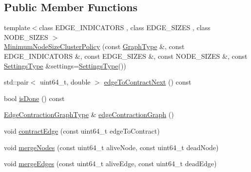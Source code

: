 \subsection*{Public Member Functions}
\begin{DoxyCompactItemize}
\item 
{\footnotesize template$<$class E\+D\+G\+E\+\_\+\+I\+N\+D\+I\+C\+A\+T\+O\+RS , class E\+D\+G\+E\+\_\+\+S\+I\+Z\+ES , class N\+O\+D\+E\+\_\+\+S\+I\+Z\+ES $>$ }\\\hyperlink{classnifty_1_1graph_1_1agglo_1_1MinimumNodeSizeClusterPolicy_a560b4f00ebeb74357401ba641fef6aea}{Minimum\+Node\+Size\+Cluster\+Policy} (const \hyperlink{classnifty_1_1graph_1_1agglo_1_1MinimumNodeSizeClusterPolicy_a6d81a64ca67c9feec052a031552282f0}{Graph\+Type} \&, const E\+D\+G\+E\+\_\+\+I\+N\+D\+I\+C\+A\+T\+O\+RS \&, const E\+D\+G\+E\+\_\+\+S\+I\+Z\+ES \&, const N\+O\+D\+E\+\_\+\+S\+I\+Z\+ES \&, const \hyperlink{structnifty_1_1graph_1_1agglo_1_1MinimumNodeSizeClusterPolicy_1_1SettingsType}{Settings\+Type} \&settings=\hyperlink{structnifty_1_1graph_1_1agglo_1_1MinimumNodeSizeClusterPolicy_1_1SettingsType}{Settings\+Type}())
\item 
std\+::pair$<$ uint64\+\_\+t, double $>$ \hyperlink{classnifty_1_1graph_1_1agglo_1_1MinimumNodeSizeClusterPolicy_a8b9eabc5875763496c5a07e0b538eab2}{edge\+To\+Contract\+Next} () const
\item 
bool \hyperlink{classnifty_1_1graph_1_1agglo_1_1MinimumNodeSizeClusterPolicy_a2ad1a9e4f1d83a110dfc1f6dbc74493f}{is\+Done} () const
\item 
\hyperlink{classnifty_1_1graph_1_1agglo_1_1MinimumNodeSizeClusterPolicy_a5c67401c61d1d283b73c3ce8a31faeb9}{Edge\+Contraction\+Graph\+Type} \& \hyperlink{classnifty_1_1graph_1_1agglo_1_1MinimumNodeSizeClusterPolicy_aca43c3bece87aa733c25cef542006a42}{edge\+Contraction\+Graph} ()
\item 
void \hyperlink{classnifty_1_1graph_1_1agglo_1_1MinimumNodeSizeClusterPolicy_a04b27c347d3c6088d1555c1ea4aa429c}{contract\+Edge} (const uint64\+\_\+t edge\+To\+Contract)
\item 
void \hyperlink{classnifty_1_1graph_1_1agglo_1_1MinimumNodeSizeClusterPolicy_a4907559af0facc33614e00b53e46c146}{merge\+Nodes} (const uint64\+\_\+t alive\+Node, const uint64\+\_\+t dead\+Node)
\item 
void \hyperlink{classnifty_1_1graph_1_1agglo_1_1MinimumNodeSizeClusterPolicy_a5e98c7c5a86bbf435affcea45ea5e95f}{merge\+Edges} (const uint64\+\_\+t alive\+Edge, const uint64\+\_\+t dead\+Edge)
\item 

\end{DoxyCompactItemize}
